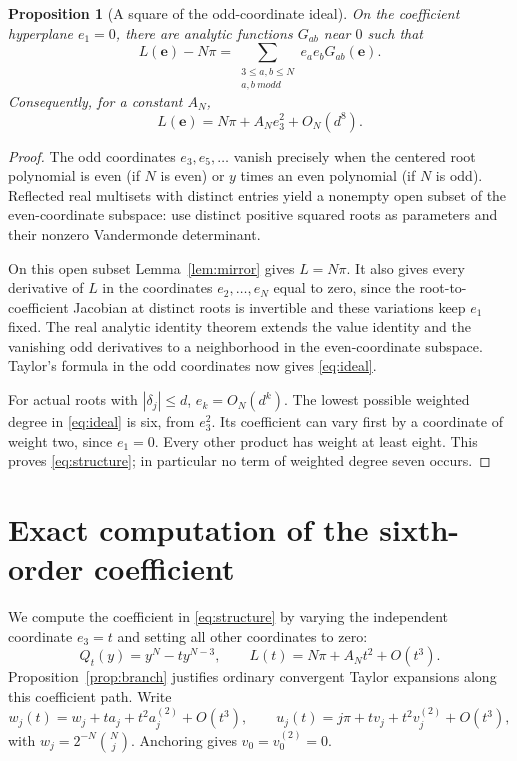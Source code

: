 \documentclass[11pt,a4paper]{article}
\newtheorem{proposition}[theorem]{Proposition}
\theoremstyle{remark}\newtheorem{remark}[theorem]{Remark}
\begin{document}
\begin{proposition}[A square of the odd-coordinate ideal]\label{prop:ideal}
On the coefficient hyperplane $e_1=0$, there are analytic functions $G_{ab}$ near $0$ such that
\begin{equation}\label{eq:ideal}
 L(\boldsymbol e)-N\pi=
  \sum_{\substack{3\le a,b\le N\\a,b\ {
m odd}}}
     e_ae_bG_{ab}(\boldsymbol e).
\end{equation}
Consequently, for a constant $A_N$,
\begin{equation}\label{eq:structure}
 L(\boldsymbol e)=N\pi+A_Ne_3^2+O_N(d^8).
\end{equation}
\end{proposition}
\begin{proof}
The odd coordinates $e_3,e_5,\ldots$ vanish precisely when the centered root polynomial is even (if $N$ is even) or $y$ times an even polynomial (if $N$ is odd). Reflected real multisets with distinct entries yield a nonempty open subset of the even-coordinate subspace: use distinct positive squared roots as parameters and their nonzero Vandermonde determinant.

On this open subset Lemma~\ref{lem:mirror} gives $L=N\pi$. It also gives every derivative of $L$ in the coordinates $e_2,\ldots,e_N$ equal to zero, since the root-to-coefficient Jacobian at distinct roots is invertible and these variations keep $e_1$ fixed. The real analytic identity theorem extends the value identity and the vanishing odd derivatives to a neighborhood in the even-coordinate subspace. Taylor's formula in the odd coordinates now gives \eqref{eq:ideal}.

For actual roots with $|\delta_j|\le d$, $e_k=O_N(d^k)$. The lowest possible weighted degree in \eqref{eq:ideal} is six, from $e_3^2$. Its coefficient can vary first by a coordinate of weight two, since $e_1=0$. Every other product has weight at least eight. This proves \eqref{eq:structure}; in particular no term of weighted degree seven occurs.
\end{proof}

\section{Exact computation of the sixth-order coefficient}\label{sec:coefficient}
We compute the coefficient in \eqref{eq:structure} by varying the independent coordinate $e_3=t$ and setting all other coordinates to zero:
\begin{equation}\label{eq:probe}
 Q_t(y)=y^N-ty^{N-3},\qquad L(t)=N\pi+A_Nt^2+O(t^3).
\end{equation}
Proposition~\ref{prop:branch} justifies ordinary convergent Taylor expansions along this coefficient path. Write
\[
 w_j(t)=w_j+ta_j+t^2a_j^{(2)}+O(t^3),\qquad
 u_j(t)=j\pi+tv_j+t^2v_j^{(2)}+O(t^3),
\]
with $w_j=2^{-N}\binom Nj$. Anchoring gives $v_0=v_0^{(2)}=0$.
\end{document}
